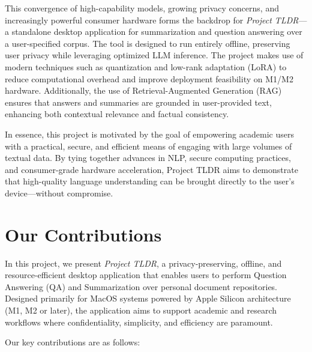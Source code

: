 This convergence of high-capability models, growing privacy concerns, and increasingly powerful consumer hardware forms the backdrop for \textit{Project TLDR}—a standalone desktop application for summarization and question answering over a user-specified corpus. The tool is designed to run entirely offline, preserving user privacy while leveraging optimized LLM inference. The project makes use of modern techniques such as quantization \cite{jacob2017quantization} and low-rank adaptation (LoRA) \cite{hu2021lora} to reduce computational overhead and improve deployment feasibility on M1/M2 hardware. Additionally, the use of Retrieval-Augmented Generation (RAG) \cite{lewis2020rag} ensures that answers and summaries are grounded in user-provided text, enhancing both contextual relevance and factual consistency.

In essence, this project is motivated by the goal of empowering academic users with a practical, secure, and efficient means of engaging with large volumes of textual data. By tying together advances in NLP, secure computing practices, and consumer-grade hardware acceleration, Project TLDR aims to demonstrate that high-quality language understanding can be brought directly to the user's device—without compromise.
\section{Our Contributions}
\label{sec:OurContributions}

In this project, we present \textit{Project TLDR}, a privacy-preserving, offline, and resource-efficient desktop application that enables users to perform Question Answering (QA) and Summarization over personal document repositories. Designed primarily for MacOS systems powered by Apple Silicon architecture (M1, M2 or later), the application aims to support academic and research workflows where confidentiality, simplicity, and efficiency are paramount.

Our key contributions are as follows:

